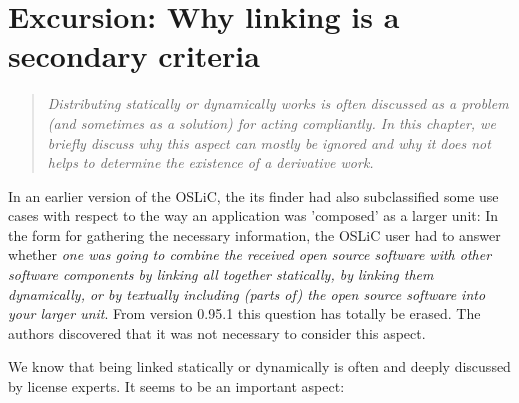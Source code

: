 %
%
%
%
%



\section{Excursion: Why linking is a secondary criteria}
\footnotesize
\begin{quote}\itshape
Distributing statically or dynamically works is often discussed as a problem
(and sometimes as a solution) for acting compliantly. In this chapter, we
briefly discuss why this aspect can mostly be ignored and why it does not helps
to determine the existence of a derivative work.
\end{quote}
\normalsize

In an earlier version of the OSLiC, the its finder had also subclassified some
use cases with respect to the way an application was 'composed' as a larger
unit: In the form for gathering the necessary information, the OSLiC user had to
answer whether \emph{one was going to combine the received open source software
with other software components by linking all together statically, by linking
them dynamically, or by textually including (parts of) the open source software
into your larger unit}. From version 0.95.1 this question has totally be erased.
The authors discovered that it was not necessary to consider this aspect.

We know that being linked statically or dynamically is often and deeply
discussed by license experts. It seems to be an important aspect:

